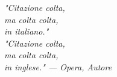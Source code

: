 \thispagestyle{empty}
\begin{flushright}
\null{}
\emph{"Citazione colta,\\ma colta colta,\\in italiano."\\} 
\null\vspace{5mm}
\emph{"Citazione colta,\\ma colta colta,\\in inglese." \break --- Opera, Autore} \null
\end{flushright}